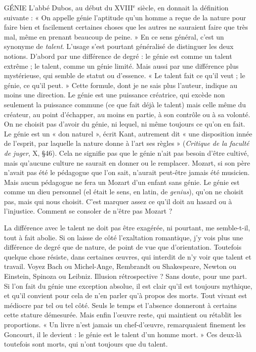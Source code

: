 GÉNIE L'abbé Dubos, au début du {\footnotesize XVIII$^\text{e}$} siècle, en donnait la définition suivante :
« On appelle génie l'aptitude qu’un homme a reçue de la
nature pour faire bien et facilement certaines choses que les autres ne sauraient
faire que très mal, même en prenant beaucoup de peine. » En ce sens général,
c’est un synonyme de {\it talent}. L'usage s’est pourtant généralisé de distinguer les
deux notions. D’abord par une différence de degré : le génie est comme un
talent extrême ; le talent, comme un génie limité. Mais aussi par une différence
plus mystérieuse, qui semble de statut ou d’essence. « Le talent fait ce qu'il
veut ; le génie, ce qu’il peut. » Cette formule, dont je ne sais plus l’auteur,
indique au moins une direction. Le génie est une puissance créatrice, qui
excède non seulement la puissance commune (ce que fait déjà le talent) mais
celle même du créateur, au point d'échapper, au moins en partie, à son contrôle
ou à sa volonté. On ne choisit pas d’avoir du génie, ni lequel, ni même toujours
ce qu’on en fait. Le génie est un « don naturel », écrit Kant, autrement dit « une
disposition innée de l'esprit, par laquelle la nature donne à l’art ses règles »
({\it Critique de la faculté de juger}, X, \S 46). Cela ne signifie pas que le génie n’ait
pas besoin d’être cultivé, mais qu'aucune culture ne saurait en donner ou le
remplacer. Mozart, si son père n'avait pas été le pédagogue que l’on sait,
n’aurait peut-être jamais été musicien. Mais aucun pédagogue ne fera un
Mozart d’un enfant sans génie. Le génie est comme un dieu personnel (el était
le sens, en latin, de {\it genius}), qu’on ne choisit pas, mais qui nous choisit. C’est
marquer assez ce qu’il doit au hasard ou à l'injustice. Comment se consoler de
n'être pas Mozart ?

La différence avec le talent ne doit pas être exagérée, ni pourtant, me
semble-t-il, tout à fait abolie. Si on laisse de côté l’exaltation romantique, j'y
vois plus une différence de degré que de nature, de point de vue que d’orientation.
Toutefois quelque chose résiste, dans certaines œuvres, qui interdit de n’y
voir que talent et travail. Voyez Bach ou Michel-Ange, Rembrandt ou Shakespeare,
Newton ou Einstein, Spinoza ou Leibniz. Illusion rétrospective ? Sans
doute, pour une part. Si l’on fait du génie une exception absolue, il est clair
qu’il est toujours mythique, et qu'il convient pour cela de n’en parler qu'à
propos des morts. Tout vivant est médiocre par tel ou tel côté. Seuls le temps
et l’absence donneront à certains cette stature démesurée. Mais enfin l’œuvre
reste, qui maintient ou rétablit les proportions. « Un livre n’est jamais un chef-d'œuvre,
remarquaient finement les Goncourt, il le devient : le génie est le
talent d’un homme mort. » Ces deux-là toutefois sont morts, qui n’ont toujours
que du talent.

